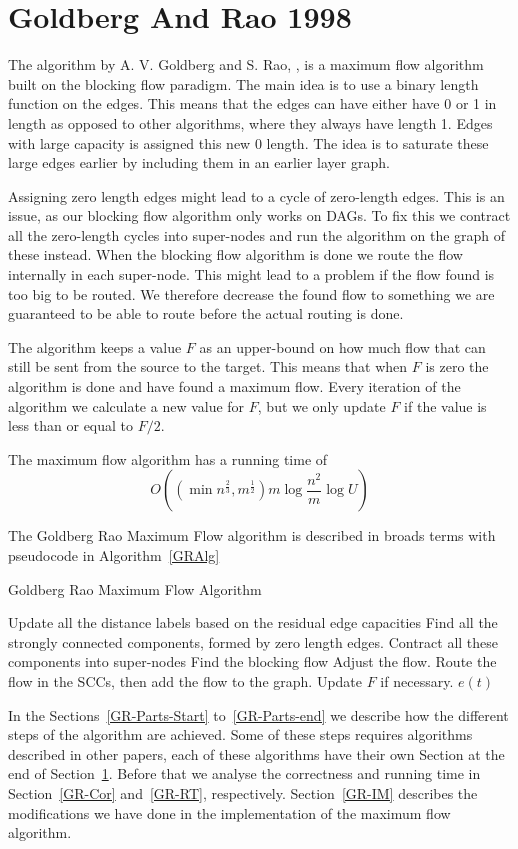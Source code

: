 \section{Goldberg And Rao 1998}
\label{GRSection}
The algorithm by A. V. Goldberg and S. Rao, \cite{Goldberg1998}, is a maximum flow algorithm built on the blocking flow paradigm. The main idea is to use a binary length
function on the edges. This means that the edges can have either have 0 or 1 in length as opposed to other algorithms, where they always have length 1. Edges with
large capacity is assigned this new 0 length. The idea is to saturate these large edges earlier by including them in an earlier layer graph. 

Assigning zero length edges might lead to a cycle of zero-length edges. This is an issue, as our blocking flow algorithm only works on DAGs. 
To fix this we contract all the zero-length cycles into super-nodes and run the algorithm on the graph of these instead.
When the blocking flow algorithm is done we route the flow internally in each super-node. This might lead to a problem if 
the flow found is too big to be routed. We therefore decrease the found flow to something we are guaranteed to be able to route before the actual routing is done.

The algorithm keeps a value $F$ as an upper-bound on how much flow that can still be sent from the source to the target.
This means that when $F$ is zero the algorithm is done and have found a maximum flow. Every iteration of the algorithm we
calculate a new value for $F$, but we only update $F$ if the value is less than or equal to $F/2$.

The maximum flow algorithm has a running time of 
$$O\left(\left(\min{n^{\frac{2}{3}},m^{\frac{1}{2}}}\right)m\log{\frac{n^2}{m}}\log{U}\right)$$

The Goldberg Rao Maximum Flow algorithm is described in broads terms with pseudocode in Algorithm~\ref{GRAlg}
\begin{algorithm}
\caption{Goldberg Rao Maximum Flow Algorithm}\label{GRAlg}
\begin{algorithmic}[1]
\Statex
{}
		\State Update all the distance labels based on the residual edge capacities
		\State Find all the strongly connected components, formed by zero length edges.
		\State Contract all these components into super-nodes
		\State Find the blocking flow
			\State Adjust the flow.
		\EndIf
		\State Route the flow in the SCCs, then add the flow to the graph.
		\State Update $F$ if necessary.
	\EndWhile
	\State \Return $e(t)$
\EndProcedure
\end{algorithmic}
\end{algorithm}
In the Sections~\ref{GR-Parts-Start} to~\ref{GR-Parts-end} we describe how the different steps of the algorithm are achieved. 
Some of these steps requires algorithms described in other papers, each of these algorithms have their own Section at the end of 
Section~\ref{GRSection}. Before that we analyse the correctness and running time in Section~\ref{GR-Cor} and~\ref{GR-RT}, respectively.
Section~\ref{GR-IM} describes the modifications we have done in the implementation of the maximum flow algorithm.


